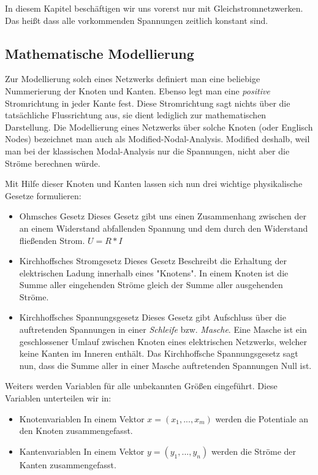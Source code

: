 \documentclass[11pt,titlepage]{article}
\begin{document}
		In diesem Kapitel beschäftigen wir uns vorerst nur mit Gleichstromnetzwerken. Das heißt dass alle vorkommenden Spannungen zeitlich konstant sind.
					
	\subsection{Mathematische Modellierung}
		Zur Modellierung solch eines Netzwerks definiert man eine beliebige Nummerierung der Knoten und Kanten. Ebenso legt man eine \textit{positive} Stromrichtung in jeder Kante fest. Diese Stromrichtung sagt nichts über die tatsächliche Flussrichtung aus, sie dient lediglich zur mathematischen Darstellung. Die Modellierung eines Netzwerks über solche Knoten (oder Englisch Nodes) bezeichnet man auch als Modified-Nodal-Analysis. Modified deshalb, weil man bei der klassischen Modal-Analysis nur die Spannungen, nicht aber die Ströme berechnen würde.
		
		Mit Hilfe dieser Knoten und Kanten lassen sich nun drei wichtige physikalische Gesetze formulieren:
		
		\begin{itemize}
			\item Ohmsches Gesetz
			\subitem Dieses Gesetz gibt uns einen Zusammenhang zwischen der an einem Widerstand abfallenden Spannung und dem durch den Widerstand fließenden Strom.
			\subitem $U = R*I$
			\item Kirchhoffsches Stromgesetz
			\subitem Dieses Gesetz Beschreibt die Erhaltung der elektrischen Ladung innerhalb eines "Knotens". In einem Knoten ist die Summe aller eingehenden Ströme gleich der Summe aller ausgehenden Ströme.
			\item Kirchhoffsches Spannungsgesetz
			\subitem Dieses Gesetz gibt Aufschluss über die auftretenden Spannungen in einer \textit{Schleife} bzw. \textit{Masche}. Eine Masche ist ein geschlossener Umlauf zwischen Knoten eines elektrischen Netzwerks, welcher keine Kanten im Inneren enthält. Das Kirchhoffsche Spannungsgesetz sagt nun, dass die Summe aller in einer Masche auftretenden Spannungen Null ist.
		\end{itemize}	
		
		Weiters werden Variablen für alle unbekannten Größen eingeführt. Diese Variablen unterteilen wir in:
		
		\begin{itemize}
			\item Knotenvariablen
			\subitem In einem Vektor $x = (x_1, ..., x_m)$ werden die Potentiale an den Knoten zusammengefasst.
			\item Kantenvariablen
			\subitem In einem Vektor $y = (y_1, ..., y_n)$ werden die Ströme der Kanten zusammengefasst.
		\end{itemize}
		
\end{document}
